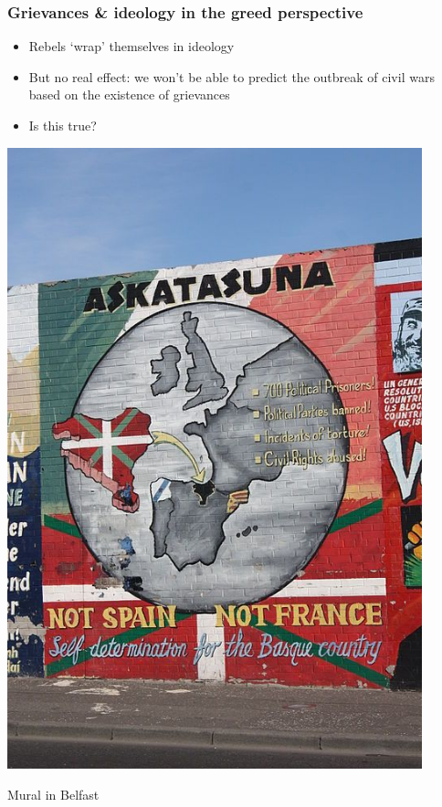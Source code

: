 \documentclass[aspectratio=43]{beamer}
\begin{document}
\begin{frame}
\frametitle{Grievances \& ideology in the greed perspective}
\centering

\begin{minipage}{0.55\textwidth}\centering
\begin{itemize}
  \item Rebels `wrap' themselves in ideology
  \item But no real effect: we won't be able to predict the outbreak of civil wars based on the existence of grievances
  \item Is this true?
\end{itemize}
\end{minipage}\hfill
\begin{minipage}{0.44\textwidth}\centering
  \includegraphics[width = 0.9\textwidth]{img/belfast_mural}

  {\small Mural in Belfast}
\end{minipage}

\end{frame}
\end{document}
